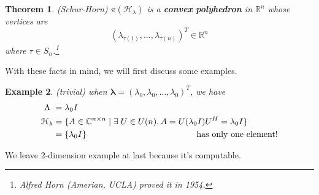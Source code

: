 \documentclass[11pt]{amsart}
\numberwithin{equation}{section}
\theoremstyle{plain}
\newtheorem{theorem}{Theorem}[section]
\newtheorem{eg}[theorem]{Example}
\theoremstyle{plain}
\numberwithin{equation}{section}
\theoremstyle{remark}
\begin{document}
\begin{theorem}(Schur-Horn)
	$\pi (\mathcal{H}_\lambda)$ is a \textbf{convex polyhedron} in $\mathbb{R}^n$ whose vertices are
	$$(\lambda_{\tau(1)},\ldots,\lambda_{\tau(n)})^T \in \mathbb{R}^n$$
	where $\tau \in S_n$.\footnote{Alfred Horn (Amerian, UCLA) proved it in 1954.}
\end{theorem}
With these facts in mind, we will first discuss some examples.
\begin{eg}(trivial)
	when $\bm{\lambda} =(\lambda_0,\lambda_0,\ldots,\lambda_0)^T$, we have
\begin{align*}
	\Lambda \,\,&= \lambda_0 I \\
	\mathcal{H}_\lambda &= \{A \in \mathbb{C}^{n \times n} \mid 
	\exists\; U \in U(n), A=U(\lambda_0 I)U^H = \lambda_0 I\} \\
	 &=\{\lambda_0 I\} \hspace{4.5cm} \text{has only one element!}
\end{align*}	
\end{eg}
 We leave 2-dimension example at last because it’s computable.
\end{document}
